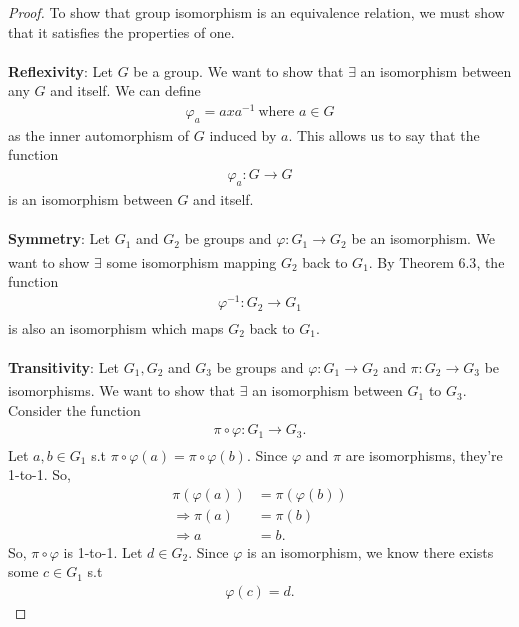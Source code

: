 \documentclass[12pt, letterpaper]{article}
\begin{document}
\begin{proof}
    To show that group isomorphism is an equivalence relation, we must show that it satisfies the properties of one. \\ \\
    \textbf{Reflexivity}: Let $G$ be a group. We want to show that $\exists$ an isomorphism between any $G$ and itself. We can define
    \begin{align*}
        \varphi_a = axa^{-1} \ \text{where $a \in G$}
    \end{align*}
    as the inner automorphism of $G$ induced by $a$. This allows us to say that the function
    \begin{align*}
        \varphi_{a}: G \xrightarrow[]{} G
    \end{align*}
    is an isomorphism between $G$ and itself. \\ \\
    \textbf{Symmetry}: Let $G_1$ and $G_2$ be groups and $\varphi: G_1 \xrightarrow[]{} G_2$ be an isomorphism. We want to show $\exists$ some isomorphism mapping $G_2$ back to $G_1$. By Theorem $6.3$, the function
    \begin{align*}
        \varphi^{-1}: G_2 \xrightarrow[]{} G_1
    \end{align*} 
    is also an isomorphism which maps $G_2$ back to $G_1$. \\ \\
    \textbf{Transitivity}: Let $G_1, G_2$ and $G_3$ be groups and $\varphi: G_1 \xrightarrow[]{} G_2$ and $\pi: G_2 \xrightarrow[]{} G_3$ be isomorphisms. We want to show that $\exists$ an isomorphism between $G_1$ to $G_3$. Consider the function
    \begin{align*}
        \pi \circ \varphi : G_1 \xrightarrow[]{} G_3.
    \end{align*}
    Let $a,b \in G_1$ s.t $\pi\circ\varphi (a) = \pi \circ \varphi (b)$.  Since $\varphi$ and $\pi$ are isomorphisms, they're 1-to-1. So,
    \begin{align*}
        \pi(\varphi(a)) &= \pi(\varphi(b)) \\
        \Rightarrow \pi(a) &= \pi(b) \\
        \Rightarrow a &= b.
    \end{align*}
    So, $\pi \circ \varphi$ is 1-to-1. Let $d \in G_2$. Since $\varphi$ is an isomorphism, we know there exists some $c \in G_1$ s.t 
    \begin{align*}
        \varphi(c) = d. 
        \end{align*}

\end{proof}
\end{document}
